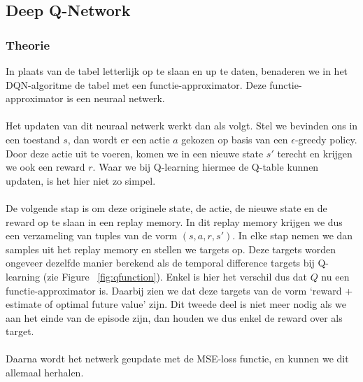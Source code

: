 \documentclass[11pt]{article}
\begin{document}
\subsection{Deep Q-Network}
\subsubsection{Theorie}
In plaats van de tabel letterlijk op te slaan en up te daten, benaderen we in het DQN-algoritme de tabel met een functie-approximator. Deze functie-approximator is een neuraal netwerk.\\\\
Het updaten van dit neuraal netwerk werkt dan als volgt. Stel we bevinden ons in een toestand $s$, dan wordt er een actie $a$ gekozen op basis van een $\epsilon$-greedy policy. Door deze actie uit te voeren, komen we in een nieuwe state $s'$ terecht en krijgen we ook een reward $r$. Waar we bij Q-learning hiermee de Q-table kunnen updaten, is het hier niet zo simpel. \\\\
De volgende stap is om deze originele state, de actie, de nieuwe state en de reward op te slaan in een replay memory. In dit replay memory krijgen we dus een verzameling van tuples van de vorm $(s,a,r,s')$. In elke stap nemen we dan samples uit het replay memory en stellen we targets op. Deze targets worden ongeveer dezelfde manier berekend als de temporal difference targets bij Q-learning (zie Figure ~\ref{fig:qfunction}). Enkel is hier het verschil dus dat $Q$ nu een functie-approximator is. Daarbij zien we dat deze targets van de vorm `reward + estimate of optimal future value' zijn. Dit tweede deel is niet meer nodig als we aan het einde van de episode zijn, dan houden we dus enkel de reward over als target. \\\\
Daarna wordt het netwerk geupdate met de MSE-loss functie, en kunnen we dit allemaal herhalen.\\
\end{document}
